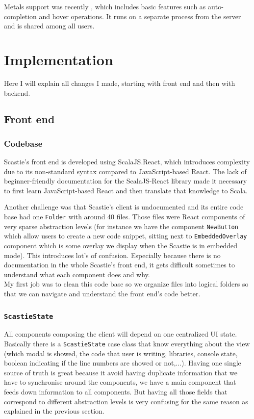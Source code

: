\documentclass[a4paper,11pt,oneside]{report}
\begin{document}
Metals support was recently \href{https://github.com/scalacenter/scastie/pull/655}{\color{blue}{introduced}}, which includes basic features such as auto-completion and hover operations. It runs on a separate process from the server and is shared among all users.

\chapter{Implementation}
Here I will explain all changes I made, starting with front end and then with backend.

\section{Front end}

\subsection{Codebase}
Scastie's front end is developed using ScalaJS.React, which introduces complexity due to its non-standard syntax compared to JavaScript-based React. The lack of beginner-friendly documentation for the ScalaJS-React library made it necessary to first learn JavaScript-based React and then translate that knowledge to Scala.

Another challenge was that Scastie's client is undocumented and its entire code base had one \lstinline{Folder} with around 40 files. Those files were React components of very sparse abstraction levels (for instance we have the component \lstinline{NewButton} which allow users to create a new code snippet, sitting next to \lstinline{EmbeddedOverlay} component which is some overlay we display when the Scastie is in embedded mode). This introduces lot's of confusion. Especially because there is no documentation in the whole Scastie's front end, it gets difficult sometimes to understand what each component does and why.\\
My first job was to clean this code base so we organize files into logical folders so that we can navigate and understand the front end's code better. 

\subsection{\lstinline{ScastieState}}
All components composing the client will depend on one centralized UI state. Basically there is a \lstinline{ScastieState} case class that know everything about the view (which modal is showed, the code that user is writing, libraries, console state, boolean indicating if the line numbers are showed or not,...). Having one single source of truth is great because it avoid having duplicate information that we have to synchronise around the components, we have a main component that feeds down information to all components. But having all those fields that correspond to different abstraction levels is very confusing for the same reason as explained in the previous section.
\end{document}
